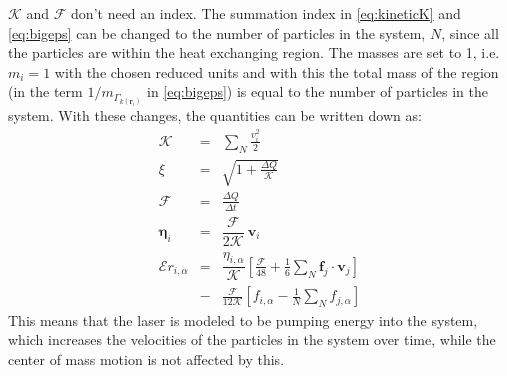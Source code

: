 \documentclass[12pt]{article}
\begin{document}
$\mathcal{K}$ and $\mathcal{F}$ don't need an index. The summation index in \eqref{eq:kineticK} and \eqref{eq:bigeps} can be changed to the number of
particles in the system, $N$, since all the particles are within the heat exchanging region. The masses are set to 1, i.e. $m_i = 1$ with the chosen
reduced units and with this the total mass of the region (in the term $1/m_{\Gamma_{k(\mathbf{r}_i)}}$ in \eqref{eq:bigeps}) is equal to the number of
particles in the system. With these changes, the quantities can be written down as:
\begin{eqnarray}
    \mathcal{K} &=& \sum_{N} \frac{v_i^2}{2}\\
    \xi &=& \sqrt{1+\frac{\Delta Q}{\mathcal{K}}}\\
    \mathcal{F} &=& \frac{\Delta Q}{\Delta t}\\
    \boldsymbol{\eta}_i &=& 
    \dfrac{\mathcal{F}}{{2\mathcal{K}}} \
        \mathbf{v}_i\\
        \mathcal{E}{r}_{i,\alpha} &=& \dfrac{\eta_{i,\alpha}}{\mathcal{K}} \left[
        \frac{\mathcal{F}}{48} + \frac{1}{6} \sum_{N} \mathbf{f}_j \cdot \mathbf{v}_j
            \right] \nonumber \\
            &-& \frac{\mathcal{F}}{12\mathcal{K}} \left[
            {f_{i,\alpha}} - \frac{1}{N} \sum_{N}f_{j,\alpha}\right]
\end{eqnarray}
This means that the laser is modeled to be pumping energy into the system, which increases the velocities of the particles in the
system over time, while the center of mass motion is not affected by this.\\
\end{document}
